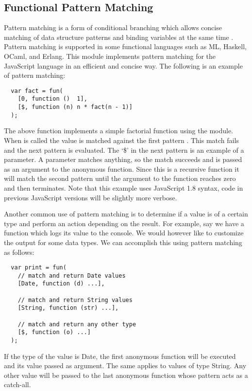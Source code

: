 \subsection{Functional Pattern Matching}
Pattern matching is a form of conditional branching which allows concise matching of data structure patterns and binding variables at the same time \cite{wikipedia09}. Pattern matching is supported in some functional languages such as ML, Haskell, OCaml, and Erlang. This  module implements pattern matching for the JavaScript language in an efficient and concise way. The following is an example of pattern matching:
\begin{verbatim}
  var fact = fun(
    [0, function ()  1],
    [$, function (n) n * fact(n - 1)]
  );
\end{verbatim}
The above function implements a simple factorial function using the  module. When  is called the value  is matched against the first pattern . This match fails and the next pattern is evaluated. The ‘\$’ in the next pattern is an example of a parameter. A parameter matches anything, so the match succeeds and  is passed as an argument to the anonymous function. Since this is a recursive function it will match the second pattern until the argument to the function reaches zero and then terminates. Note that this example uses JavaScript 1.8 syntax, code in previous JavaScript versions will be slightly more verbose.

Another common use of pattern matching is to determine if a value is of a certain type and perform an action depending on the result. For example, say we have a  function which logs its value to the console. We would however like to customize the output for some data types. We can accomplish this using pattern matching as follows:
\begin{verbatim}
  var print = fun(
    // match and return Date values
    [Date, function (d) ...],

    // match and return String values
    [String, function (str) ...],

    // match and return any other type
    [$, function (o) ...]
  );
\end{verbatim}
If the type of the value is Date, the first anonymous function will be executed and its value passed as argument. The same applies to values of type String. Any other value will be passed to the last anonymous function whose pattern acts as a catch-all. 

